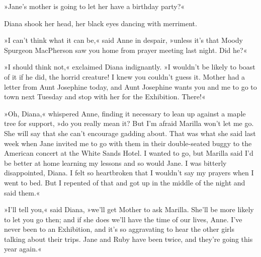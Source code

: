 »Jane's mother is going to let her have a birthday party?«

Diana shook her head, her black eyes dancing with merriment.

»I can't think what it can be,« said Anne in despair, »unless it's that Moody Spurgeon MacPherson saw you home from prayer meeting last night. Did he?«

»I should think not,« exclaimed Diana indignantly. »I wouldn't be likely to boast of it if he did, the horrid creature! I knew you couldn't guess it. Mother had a letter from Aunt Josephine today, and Aunt Josephine wants you and me to go to town next Tuesday and stop with her for the Exhibition. There!«

»Oh, Diana,« whispered Anne, finding it necessary to lean up against a maple tree for support, »do you really mean it? But I'm afraid Marilla won't let me go. She will say that she can't encourage gadding about. That was what she said last week when Jane invited me to go with them in their double-seated buggy to the American concert at the White Sands Hotel. I wanted to go, but Marilla said I'd be better at home learning my lessons and so would Jane. I was bitterly disappointed, Diana. I felt so heartbroken that I wouldn't say my prayers when I went to bed. But I repented of that and got up in the middle of the night and said them.«

»I'll tell you,« said Diana, »we'll get Mother to ask Marilla. She'll be more likely to let you go then; and if she does we'll have the time of our lives, Anne. I've never been to an Exhibition, and it's so aggravating to hear the other girls talking about their trips. Jane and Ruby have been twice, and they're going this year again.«

